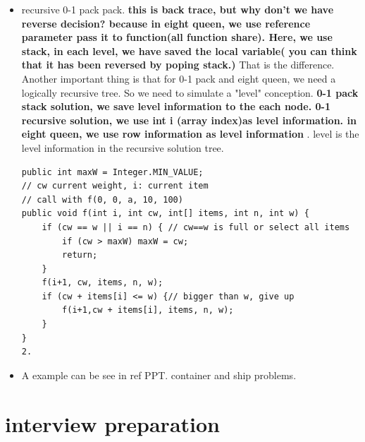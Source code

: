 \documentclass[a4paper,11pt,twoside]{book}
\begin{document}
\begin{itemize}
\item recursive 0-1 pack pack. \textbf{this is back trace, but why don't we have reverse decision? because in eight queen, we use reference parameter pass it to function(all function share). Here, we use stack, in each level, we have saved the local variable( you can think that it has been reversed by poping stack.) } That is the difference.  Another important thing is that for 0-1 pack and eight queen,  we need a logically recursive tree. So we need to simulate a "level" conception.  \textbf{0-1 pack stack solution, we save level information to the each node. 0-1 recursive solution, we use int i (array index)as level information. in eight queen, we use row information as level information }. level is the level information in the recursive solution tree.  
\begin{lstlisting}
public int maxW = Integer.MIN_VALUE; 
// cw current weight, i: current item
// call with f(0, 0, a, 10, 100)
public void f(int i, int cw, int[] items, int n, int w) {
	if (cw == w || i == n) { // cw==w is full or select all items
		if (cw > maxW) maxW = cw;
		return;
	}
	f(i+1, cw, items, n, w);
	if (cw + items[i] <= w) {// bigger than w, give up
		f(i+1,cw + items[i], items, n, w);
	}
}
2.
\end{lstlisting}


\item A example can be see in ref PPT.  container and ship problems. 

\end{itemize}


\chapter{interview preparation}
\end{document}
